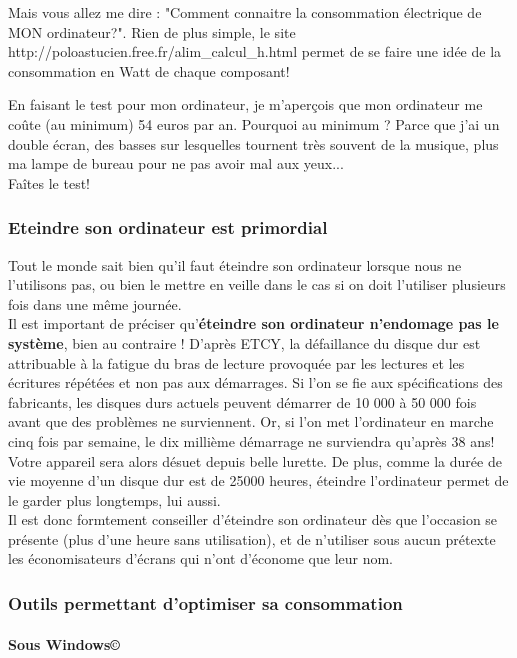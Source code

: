 \documentclass[a4paper,11pt,french]{article}
\begin{document}
Mais vous allez me dire : "Comment connaitre la consommation électrique de MON ordinateur?". Rien de plus simple, le site \textsf{http://poloastucien.free.fr/alim\_{}calcul\_{}h.html} permet de se faire une idée de la consommation en Watt de chaque composant!

En faisant le test pour mon ordinateur, je m'aperçois que mon ordinateur me coûte (au minimum) 54 euros par an. Pourquoi au minimum ? Parce que j'ai un double écran, des basses sur lesquelles tournent très souvent de la musique, plus ma lampe de bureau pour ne pas avoir mal aux yeux...\\

Faîtes le test!

\subsubsection{Eteindre son ordinateur est primordial}
Tout le monde sait bien qu'il faut éteindre son ordinateur lorsque nous ne l'utilisons pas, ou bien le mettre en veille dans le cas si on doit l'utiliser plusieurs fois dans une même journée.\\
Il est important de préciser qu'\textbf{éteindre son ordinateur n'endomage pas le système}, bien au contraire ! D'après ETCY, la défaillance du disque dur est attribuable à la fatigue du bras de lecture provoquée par les lectures et les écritures répétées et non pas aux démarrages. Si l'on se fie aux spécifications des fabricants, les disques durs actuels peuvent démarrer de 10 000 à 50 000 fois avant que des problèmes ne surviennent. Or, si l'on met l'ordinateur en marche cinq fois par semaine, le dix millième démarrage ne surviendra qu'après 38 ans! Votre appareil sera alors désuet depuis belle lurette. De plus, comme la durée de vie moyenne d'un disque dur est de 25000 heures, éteindre l'ordinateur permet de le garder plus longtemps, lui aussi.\\

Il est donc formtement conseiller d'éteindre son ordinateur dès que l'occasion se présente (plus d'une heure sans utilisation), et de n'utiliser sous aucun prétexte les économisateurs d'écrans qui n'ont d'économe que leur nom.



\subsubsection{Outils permettant d'optimiser sa consommation}
\paragraph{Sous Windows\copyright}
\end{document}
